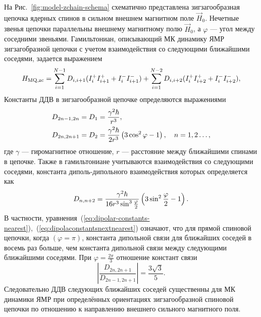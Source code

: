 На Рис.~\ref{fig:model-zchain-schema} схематично представлена
зигзагообразная цепочка ядерных спинов в сильном внешнем магнитном поле $\vec{H}_0$.
Нечетные звенья цепочки параллельны внешнему магнитному полю $\vec{H}_0$,
а $\varphi$ --- угол между соседними звеньями.
Гамильтониан,
описывающий МК динамику ЯМР зигзагобразной цепочки с учетом взаимодействия со следующими ближайшими соседями, задается выражением~\cite{Doronin2000}
%
\begin{equation}\label{hmq-next-nearest}
  H_\mathrm{MQ, zc} = \sum_{i=1}^{N-1} D_{i, i+1}(I_i^{+}I_{i+1}^{+}+ I_i^{-}I_{i+1}^{-} ) + \sum_{i=1}^{N-2} D_{i, i+2} (I_i^{+}I_{i+2}^{+}+ I_i^{-}I_{i+2}^{-} ),
\end{equation}
%
\hmqZChainNextNearestExplanatoryNote
%
Константы ДДВ
в зигзагообразной цепочке определяются выражениями~\cite{Abragam1982}
%
\begin{align}\label{eq:dipolar-constants-nearest}
  D_{2n-1, 2n} & = D_1 =\dfrac{\gamma^2\hbar }{r^3},
  \\
  D_{2n, 2n+1} & = D_2=\dfrac{\gamma^2\hbar }{2r^3}\left( 3\cos^2 \varphi -1 \right),
  \quad n=1,2\dots,
\end{align}
%
где $\gamma$ --- гиромагнитное отношение,
$r$ --- расстояние между ближайшими спинами в цепочке.
Также в гамильтониане учитываются взаимодействия со следующими соседями,
константа диполь-дипольного взаимодействия которых определяется как~\cite{Abragam1982}
%
\begin{equation}\label{eq:dipolaconstantsnextnearest}
  D_{n, n+2}=\dfrac{\gamma^2\hbar }{16r^3 \sin^3 \frac{\varphi}{2}}\left( 3\sin^2 \frac{\varphi}{2} -1 \right).
\end{equation}
%
В частности, уравнения~(\ref{eq:dipolar-constants-nearest}),~(\ref{eq:dipolaconstantsnextnearest}) означают,
что для прямой спиновой цепочки, когда  $(\varphi=\pi)$,
константа дипольной связи для ближайших соседей в восемь раз больше,
чем константа дипольной связи между следующими ближайшими соседями.
При $\varphi=\frac{2\pi}{3}$ отношение констант связи
\begin{equation}
  \left|\dfrac{D_{2n, 2n+1}}{D_{2n-1, 2n+1}}\right| = \dfrac{3\sqrt{3}}{5}.
\end{equation}
Следовательно ДДВ следующих ближайших соседей
существенны для МК динамики ЯМР при определённых ориентациях зигзагообразной спиновой цепочки
по отношению к направлению внешнего сильного магнитного поля.

